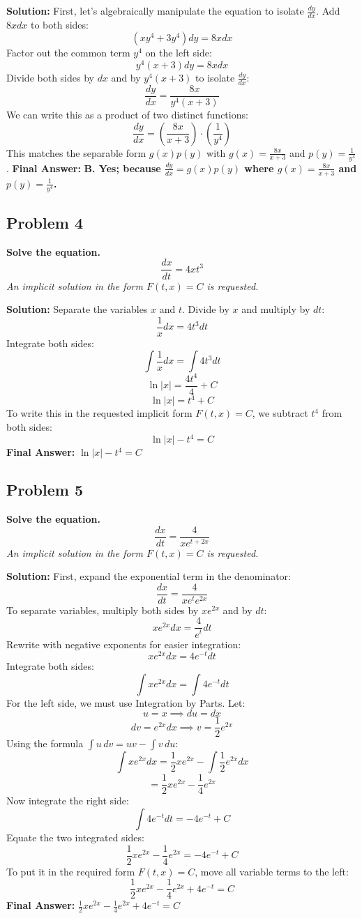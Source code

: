 \documentclass[11pt]{article}
\begin{document}
\textbf{Solution:}
First, let's algebraically manipulate the equation to isolate $\frac{dy}{dx}$. 
Add $8x dx$ to both sides:
\[ (xy^4 + 3y^4)dy = 8x dx \]
Factor out the common term $y^4$ on the left side:
\[ y^4(x+3)dy = 8x dx \]
Divide both sides by $dx$ and by $y^4(x+3)$ to isolate $\frac{dy}{dx}$:
\[ \frac{dy}{dx} = \frac{8x}{y^4(x+3)} \]
We can write this as a product of two distinct functions:
\[ \frac{dy}{dx} = \left( \frac{8x}{x+3} \right) \cdot \left( \frac{1}{y^4} \right) \]
This matches the separable form $g(x)p(y)$ with $g(x) = \frac{8x}{x+3}$ and $p(y) = \frac{1}{y^4}$.
\newline
\textbf{Final Answer:} \textbf{B. Yes; because $\frac{dy}{dx} = g(x)p(y)$ where $g(x) = \frac{8x}{x+3}$ and $p(y) = \frac{1}{y^4}$.}

\vspace{0.5cm}
\subsection*{Problem 4}
\textbf{Solve the equation.}
\[ \frac{dx}{dt} = 4xt^3 \]
\textit{An implicit solution in the form $F(t,x)=C$ is requested.}

\textbf{Solution:}
Separate the variables $x$ and $t$. Divide by $x$ and multiply by $dt$:
\[ \frac{1}{x} dx = 4t^3 dt \]
Integrate both sides:
\[ \int \frac{1}{x} dx = \int 4t^3 dt \]
\[ \ln|x| = \frac{4t^4}{4} + C \]
\[ \ln|x| = t^4 + C \]
To write this in the requested implicit form $F(t,x)=C$, we subtract $t^4$ from both sides:
\[ \ln|x| - t^4 = C \]
\textbf{Final Answer:} \textbf{$\ln|x| - t^4 = C$}

\vspace{0.5cm}
\subsection*{Problem 5}
\textbf{Solve the equation.}
\[ \frac{dx}{dt} = \frac{4}{x e^{t+2x}} \]
\textit{An implicit solution in the form $F(t,x)=C$ is requested.}

\textbf{Solution:}
First, expand the exponential term in the denominator:
\[ \frac{dx}{dt} = \frac{4}{x e^t e^{2x}} \]
To separate variables, multiply both sides by $x e^{2x}$ and by $dt$:
\[ x e^{2x} dx = \frac{4}{e^t} dt \]
Rewrite with negative exponents for easier integration:
\[ x e^{2x} dx = 4e^{-t} dt \]
Integrate both sides:
\[ \int x e^{2x} dx = \int 4e^{-t} dt \]
For the left side, we must use Integration by Parts. Let:
\[ u = x \implies du = dx \]
\[ dv = e^{2x} dx \implies v = \frac{1}{2}e^{2x} \]
Using the formula $\int u \, dv = uv - \int v \, du$:
\[ \int x e^{2x} dx = \frac{1}{2}x e^{2x} - \int \frac{1}{2}e^{2x} dx \]
\[ = \frac{1}{2}x e^{2x} - \frac{1}{4}e^{2x} \]
Now integrate the right side:
\[ \int 4e^{-t} dt = -4e^{-t} + C \]
Equate the two integrated sides:
\[ \frac{1}{2}x e^{2x} - \frac{1}{4}e^{2x} = -4e^{-t} + C \]
To put it in the required form $F(t,x)=C$, move all variable terms to the left:
\[ \frac{1}{2}x e^{2x} - \frac{1}{4}e^{2x} + 4e^{-t} = C \]
\textbf{Final Answer:} \textbf{$\frac{1}{2}xe^{2x} - \frac{1}{4}e^{2x} + 4e^{-t} = C$}
\end{document}
